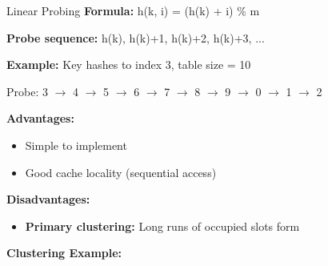 \documentclass[aspectratio=169]{beamer}
\begin{document}
\begin{frame}{Linear Probing}
  \textbf{Formula:} h(k, i) = (h(k) + i) \% m

  \textbf{Probe sequence:} h(k), h(k)+1, h(k)+2, h(k)+3, ...

  \vspace{0.3cm}
  \textbf{Example:} Key hashes to index 3, table size = 10
  \begin{center}
    Probe: 3 $\rightarrow$ 4 $\rightarrow$ 5 $\rightarrow$ 6 $\rightarrow$ 7 $\rightarrow$ 8 $\rightarrow$ 9 $\rightarrow$ 0 $\rightarrow$ 1 $\rightarrow$ 2
  \end{center}

  \vspace{0.3cm}
  \textbf{Advantages:}
  \begin{itemize}
    \item Simple to implement
    \item Good cache locality (sequential access)
  \end{itemize}

  \textbf{Disadvantages:}
  \begin{itemize}
    \item \textbf{Primary clustering:} Long runs of occupied slots form
  \end{itemize}

  \vspace{0.3cm}
  \textbf{Clustering Example:}
  \begin{center}
  \end{center}
\end{frame}
\end{document}
